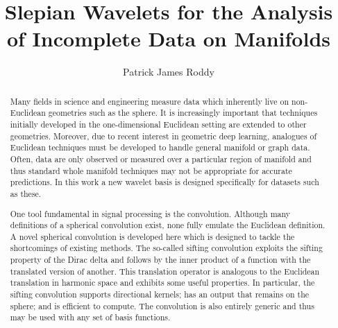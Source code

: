 
\title{Slepian Wavelets for the Analysis of Incomplete Data on Manifolds}
\author{Patrick James Roddy}

\maketitle
\makedeclaration{}

\begin{abstract} %
	Many fields in science and engineering measure data which inherently live on non-Euclidean geometries such as the sphere.
	It is increasingly important that techniques initially developed in the one-dimensional Euclidean setting are extended to other geometries.
	Moreover, due to recent interest in geometric deep learning, analogues of Euclidean techniques must be developed to handle general manifold or graph data.
	Often, data are only observed or measured over a particular region of manifold and thus standard whole manifold techniques may not be appropriate for accurate predictions.
	In this work a new wavelet basis is designed specifically for datasets such as these.

	One tool fundamental in signal processing is the convolution.
	Although many definitions of a spherical convolution exist, none fully emulate the Euclidean definition.
	A novel spherical convolution is developed here which is designed to tackle the shortcomings of existing methods.
	The so-called sifting convolution exploits the sifting property of the Dirac delta and follows by the inner product of a function with the translated version of another.
	This translation operator is analogous to the Euclidean translation in harmonic space and exhibits some useful properties.
	In particular, the sifting convolution supports directional kernels; has an output that remains on the sphere; and is efficient to compute.
	The convolution is also entirely generic and thus may be used with any set of basis functions.
\end{abstract}

